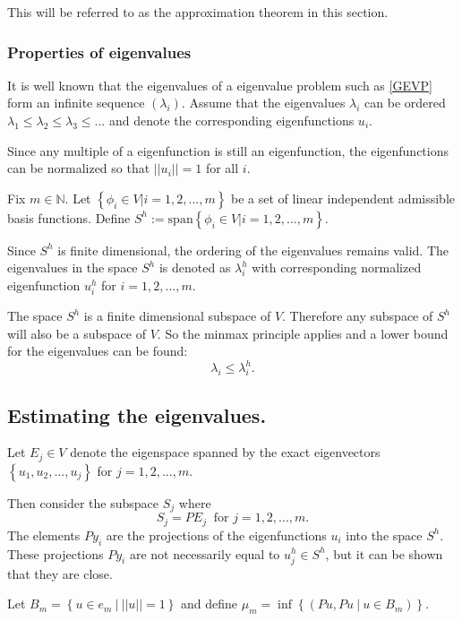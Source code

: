 \documentclass[../../main.tex]{subfiles}
\begin{document}
This will be referred to as the approximation theorem in this section.

\subsubsection*{Properties of eigenvalues}
It is well known that the eigenvalues of a eigenvalue problem such as \eqref{GEVP} form an infinite sequence $(\lambda_i)$. Assume that the eigenvalues $\lambda_i$ can be ordered $\lambda_1 \leq \lambda_2 \leq \lambda_3 \leq ...$ and denote the corresponding eigenfunctions $u_i$.

Since any multiple of a eigenfunction is still an eigenfunction, the eigenfunctions can be normalized so that $||u_i|| = 1$ for all $i$.

Fix $m \in \mathbb{N}$. \label{sym:natural} Let $\left\{ \phi_i \in V | i = 1,2,...,m \right\}$ be a set of linear independent admissible basis functions. Define $S^h := \text{span}\left\{\phi_i \in V | i = 1,2,...,m\right\}$.

Since $S^h$ is finite dimensional, the ordering of the eigenvalues remains valid. The eigenvalues in the space $S^h$ is denoted as $\lambda_i^h$ with corresponding normalized eigenfunction $u^h_i$ for $i = 1,2,...,m$.

The space $S^h$\label{sym:Sh1} is a finite dimensional subspace of $V$. Therefore any subspace of $S^h$ will also be a subspace of $V$. So the minmax principle applies and a lower bound for the eigenvalues can be found:
\begin{equation}
	\lambda_i \leq \lambda_i^h.
\end{equation}

\subsection{Estimating the eigenvalues.}
Let $E_j \in V$ denote the eigenspace spanned by the exact eigenvectors $\left\{u_1,u_2,...,u_j \right\}$ for $j = 1,2,...,m$.

Then consider the subspace $S_j$ where
\begin{equation*}
	S_j = PE_j \ \text{ for } j = 1,2,...,m.
\end{equation*} The elements $Py_i$ are the projections of the eigenfunctions $u_i$ into the space $S^h$. These projections $Py_i$ are not necessarily equal to $u^h_j \in S^h$, but it can be shown that they are close.

Let $B_m = \left\{u \in e_m \ | \ ||u|| = 1 \right\}$ and define $\mu_m = \inf\left\{(Pu,Pu \ | \ u \in B_m)\right\}$.
\end{document}
